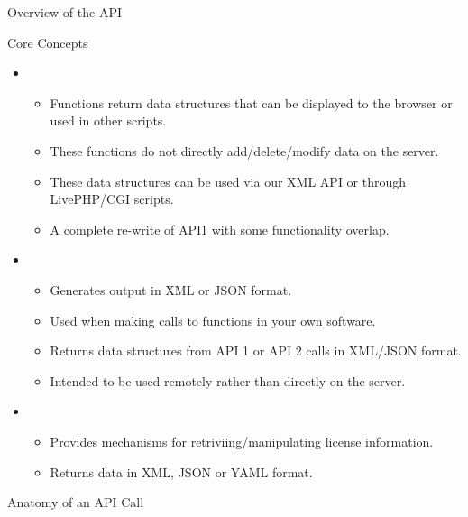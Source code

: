 \begin{section}{Overview of the \cPanel API}
\begin{subsection}{Core Concepts}
\begin{itemize}
      \begin{itemize}
      \item Functions directly add/delete/modify data on the server.
      \item Data is printed directly to the \cPanel interface.
      \item Useful for writing skins or themes.
      \end{itemize}
    \item {}
      \begin{itemize}
      \item Functions return data structures that can be displayed to the browser or used in other scripts.
      \item These functions do not directly add/delete/modify data on the server.
      \item These data structures can be used via our XML API or through LivePHP/CGI scripts.
      \item A complete re-write of API1 with some functionality overlap.
      \end{itemize}
    \item {}
      \begin{itemize}
      \item Generates output in XML or JSON format.
      \item Used when making calls to \cPanel functions in your own software.
      \item Returns data structures from API 1 or API 2 calls in XML/JSON format.
      \item Intended to be used remotely rather than directly on the server.
      \end{itemize}
    \item {}
      \begin{itemize}
      \item Provides mechanisms for retriviing/manipulating license information.
      \item Returns data in XML, JSON or YAML format.
      \end{itemize}
    \end{itemize}
  \end{subsection}

  \begin{subsection}{Anatomy of an API Call}
    

  \end{subsection}

\end{section}

